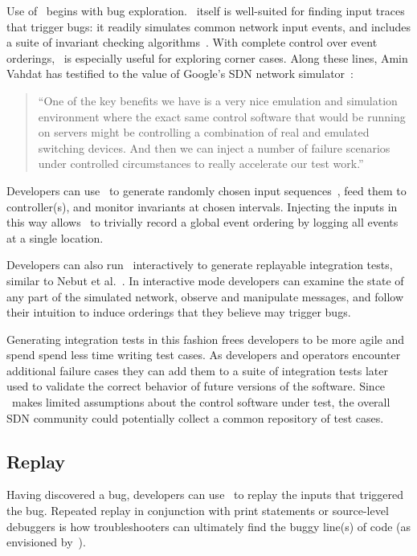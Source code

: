 Use of \projectname~begins with bug exploration.
\projectname~itself is well-suited for finding input traces that trigger bugs:
it readily simulates common network input events, and includes a suite of invariant checking
algorithms~\cite{hsa}. With complete control over event orderings, \projectname~is
especially useful for exploring corner cases.
Along these lines, Amin Vahdat
has testified to the value of Google's SDN network simulator~\cite{vadhat}:
\begin{quote}
``One of the key benefits we have is a very nice emulation and
simulation environment where the exact same control software that would be
running on servers might be controlling a combination of real and emulated
switching devices. And then we can inject a number of failure scenarios under
controlled circumstances to really accelerate our test work.''
\end{quote}

Developers can use \projectname~to generate randomly chosen input
sequences~\cite{Miller:1990:ESR:96267.96279}, feed them to controller(s), and monitor invariants at chosen
intervals. Injecting the inputs in this way allows \projectname~to trivially
record a global event ordering by logging all events at a single location.

Developers can also run \projectname~interactively to generate replayable integration
tests, similar to Nebut et al.~\cite{automated_tests}. In interactive
mode developers can
examine the state of any part of the simulated network,
observe and manipulate messages, and follow their
intuition to induce orderings that they believe may trigger bugs.

Generating integration tests in this fashion frees developers to be more agile
and spend spend less time writing test cases.
As developers and operators encounter additional failure cases they can add
them to a suite of integration tests later used to validate the correct
behavior of future versions of the software. Since \projectname~makes
limited assumptions about the control software under test, the overall SDN community
could potentially collect a common repository of test cases.

\subsection{Replay}

Having discovered a bug, developers can use \projectname~to replay the
inputs that triggered the bug. Repeated replay in conjunction with
print statements or source-level debuggers is how troubleshooters can ultimately find the buggy
line(s) of code (as envisioned by~\cite{ofrewind}).

